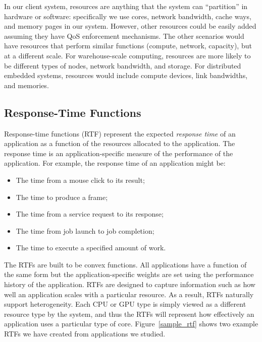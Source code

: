 In our client system, resources are anything that the system can
``partition'' in hardware or software: specifically we use cores,
network bandwidth, cache ways, and memory pages in our system.
However, other resources could be easily added assuming they have QoS
enforcement mechanisms.  The other scenarios would have resources that
perform similar functions (compute, network, capacity), but at a
different scale. For warehouse-scale computing, resources are more
likely to be different types of nodes, network bandwidth, and
storage. For distributed embedded systems, resources would include
compute devices, link bandwidths, and memories.

\subsection{Response-Time Functions}

Response-time functions (RTF) represent the expected \emph{response
  time} of an application as a function of the resources allocated to
the application. The response time is an application-specific measure
of the performance of the application.  For example, the response time
of an application might be:
    \begin{itemize}\itemsep0pt \parskip0pt 
    \item The time from a mouse click to its result;
    \item The time to produce a frame;
    \item The time from a service request to its response;
    \item The time from job launch to job completion;
    \item The time to execute a specified amount of work.
    \end{itemize}

The RTFs are built to be convex functions.  All applications have a
function of the same form but the application-specific weights are set
using the performance history of the application.  RTFs are designed
to capture information such as how well an application scales with a
particular resource. As a result, RTFs naturally support
heterogeneity.  Each CPU or GPU type is simply viewed as a different
resource type by the system, and thus the RTFs will represent how
effectively an application uses a particular type of
core. Figure~\ref{sample_rtf} shows two example RTFs we have created
from applications we studied.

